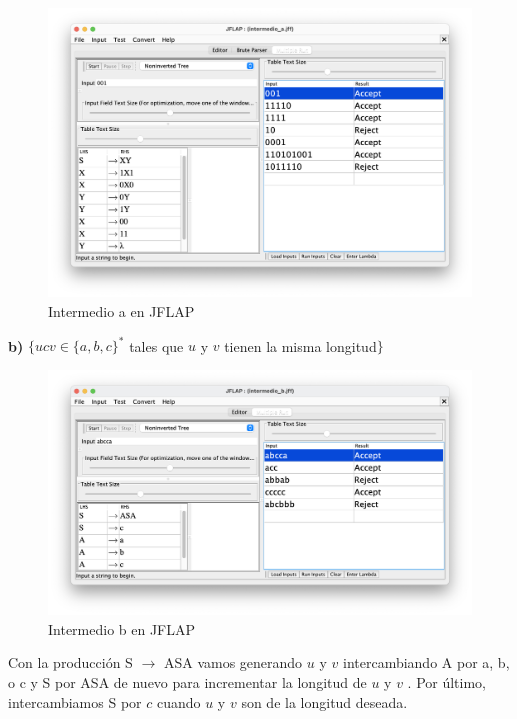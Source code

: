 \begin{figure}[H] 
	\centering
	\includegraphics[scale=0.325]{../practica_1/images/intermedio_a.png} 
	\caption{Intermedio a en JFLAP} 
    \label{fig:intermedio_a}
\end{figure}

\textbf{b)}  $\{ ucv \in \{a,b,c\}^{\ast} $ tales que $u$ y $v$ tienen la misma longitud$\}$

\begin{figure}[H] 
	\centering
	\includegraphics[scale=0.35]{../practica_1/images/intermedio_b.png} 
	\caption{Intermedio b en JFLAP} 
    \label{fig:intermedio_b}
\end{figure}

Con la producción S $\rightarrow$ ASA vamos generando $u$ y $v$  intercambiando A por a, b, o c y S por ASA de nuevo para incrementar la longitud de $u$ y $v$ . Por último,
intercambiamos S por $c$ cuando $u$ y $v$  son de la longitud deseada. \\

